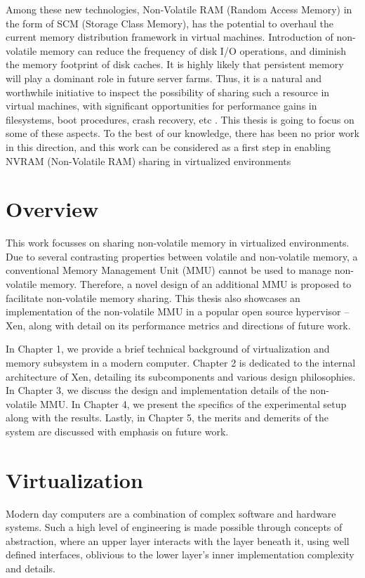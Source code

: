 Among these new technologies, Non-Volatile RAM (Random Access Memory) in the form of SCM (Storage Class Memory), has the potential to overhaul the current memory distribution framework in virtual machines. Introduction of non-volatile memory can reduce the frequency of disk I/O operations, and diminish the memory footprint of disk caches. It is highly likely that persistent memory will play a dominant role in future server farms. Thus, it is a natural and worthwhile initiative to inspect the possibility of sharing such a resource in virtual machines, with significant opportunities for performance gains in filesystems, boot procedures, crash recovery, etc \cite{nvm_benefits1} \cite{nvm_benefits2}. This thesis is going to focus on some of these aspects. To the best of our knowledge, there has been no prior work in this direction, and this work can be considered as a first step in enabling NVRAM (Non-Volatile RAM) sharing in virtualized environments 

\section{Overview}

This work focusses on sharing non-volatile memory in virtualized environments. Due to several contrasting properties between volatile and non-volatile memory, a conventional Memory Management Unit (MMU) cannot be used to manage non-volatile memory. Therefore, a novel design of an additional MMU is proposed to facilitate non-volatile memory sharing. This thesis also showcases an implementation of the non-volatile MMU in a popular open source hypervisor -- Xen, along with detail on its performance metrics and directions of future work.

In Chapter 1, we provide a brief technical background of virtualization and memory subsystem in a modern computer. Chapter 2 is dedicated to the internal architecture of Xen, detailing its subcomponents and various design philosophies. In Chapter 3, we discuss the design and implementation details of the non-volatile MMU. In Chapter 4, we present the specifics of the experimental setup along with the results. Lastly, in Chapter 5, the merits and demerits of the system are discussed with emphasis on future work. 

\section{Virtualization}
Modern day computers are a combination of complex software and hardware systems. Such a high level of engineering is made possible through concepts of abstraction, where an upper layer interacts with the layer beneath it, using well defined interfaces, oblivious to the lower layer's inner implementation complexity and details.


